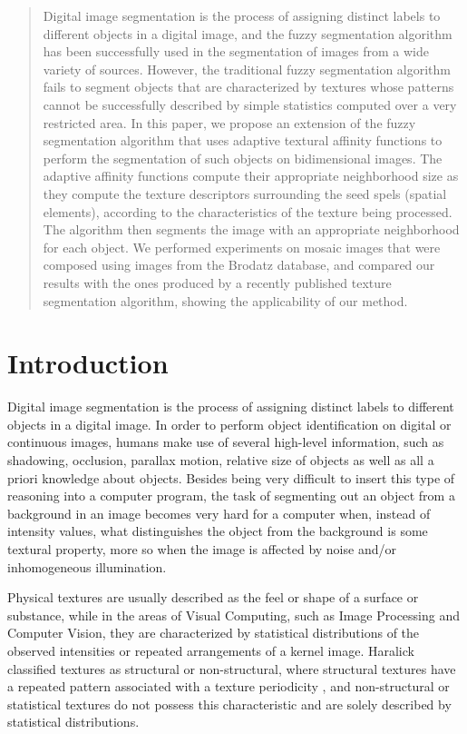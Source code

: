 \documentclass[10pt,twocolumn,letterpaper]{article}
\begin{document}
\begin{abstract}
   Digital image segmentation is the process of assigning distinct labels to different objects in a digital image, and the fuzzy segmentation algorithm has been successfully used in the segmentation of images from a wide variety of sources. However, the traditional fuzzy segmentation algorithm fails to segment objects that are characterized by textures whose patterns cannot be successfully described by simple statistics computed over a very restricted area. In this paper, we propose an extension of the fuzzy segmentation algorithm that uses adaptive textural affinity functions to perform the segmentation of such objects on bidimensional images. The adaptive affinity functions compute their appropriate neighborhood size as they compute the texture descriptors surrounding the seed spels (spatial elements), according to the characteristics of the texture being processed. The algorithm then segments the image with an appropriate neighborhood for each object. We performed experiments on mosaic images that were composed using images from the Brodatz database, and compared our results with the ones produced by a recently published texture segmentation algorithm, showing the applicability of our method.
\end{abstract}

\section{Introduction}\label{sec:Intro}

Digital image segmentation is the process of assigning distinct labels to different objects in a digital image. In order to perform object identification on digital or continuous images, humans make use of several high-level information, such as shadowing, occlusion, parallax motion, relative size of objects as well as all a priori knowledge about objects. Besides being very difficult to insert this type of reasoning into a computer program, the task of segmenting out an object from a background in an image becomes very hard for a computer when, instead of intensity values, what distinguishes the object from the background is some textural property, more so when the image is affected by noise and/or inhomogeneous illumination.

Physical textures are usually described as the feel or shape of a surface or substance, while in the areas of Visual Computing, such as Image Processing and Computer Vision, they are characterized by statistical distributions of the observed intensities or repeated arrangements of a kernel image. Haralick \cite{HARA79a} classified textures as structural or non-structural, where structural textures have a repeated pattern associated with a texture periodicity \cite{JAN98a}, and non-structural or statistical textures do not possess this characteristic and are solely described by statistical distributions.
\end{document}

